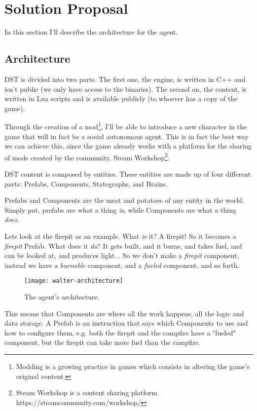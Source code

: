 \section{Solution Proposal}
\label{sec:solution-proposal}
In this section I'll describe the architecture for the agent.

\subsection{Architecture}
\ac{DST} is divided into two parts.
The first one, the engine, is written in C++ and isn't public (we only have access to the binaries).
The second on, the content, is written in Lua scripts and is available publicly (to whoever has a copy of the game).

Through the creation of a mod\footnote{Modding is a growing practice in games which consists in altering the game's original content.}, I'll be able to introduce a new character in the game that will in fact be a social autonomous agent.
This is in fact the best way we can achieve this, since the game already works with a platform for the sharing of mods created by the community, Steam Workshop\footnote{Steam Workshop is a content sharing platform. https://steamcommunity.com/workshop/}.

\ac{DST} content is composed by entities.
These entities are made up of four different parts: Prefabs, Components, Stategraphs, and Brains.

Prefabs and Components are the meat and potatoes of any entity in the world.
Simply put, prefabs are what a thing \textit{is}, while Components are what a thing \textit{does}.

Lets look at the firepit as an example.
What \textit{is} it?
A firepit!
So it becomes a \textit{firepit} Prefab.
What does it \textit{do}?
It gets built, and it burns, and takes fuel, and can be looked at, and produces light...
So we don't make a \textit{firepit} component, instead we have a \textit{burnable} component, and a \textit{fueled} component, and so forth.

\begin{figure}
  \centering
    \texttt{[image: walter-architecture]}
  \caption{The agent's architecture.}
  \label{fig:walter-architecture}
\end{figure}

This means that Components are where all the work happens, all the logic and data storage.
A Prefab is an instruction that says which Components to use and how to configure them, e.g. both the firepit and the campfire have a "fueled" component, but the firepit can take more fuel than the campfire.

